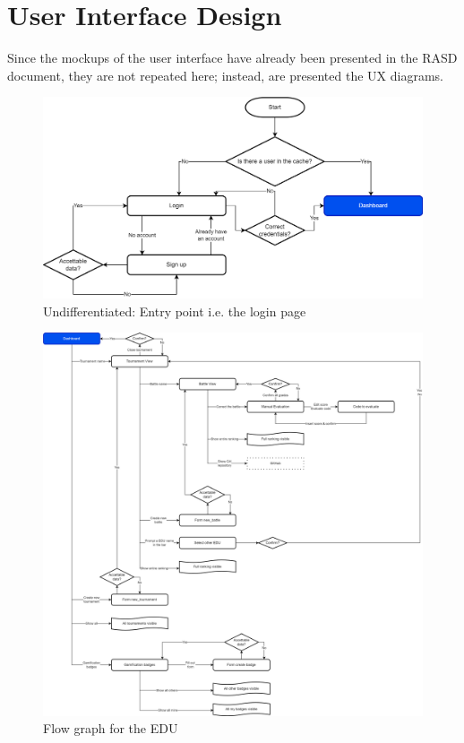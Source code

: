 \chapter{User Interface Design}
Since the mockups of the user interface have already been presented in the RASD document, they are not repeated here; instead, are presented the UX diagrams.

\begin{figure}[H]
    \centering
    \includegraphics[width=\textwidth]{images/UX/UX-Entry_point.drawio.png}
    \caption{Undifferentiated: Entry point i.e. the login page}
\end{figure}

\begin{figure}[H]
    \centering
    \includegraphics[width=\textwidth]{images/UX/UX-EDU.drawio.png}
    \caption{Flow graph for the EDU}
\end{figure}

